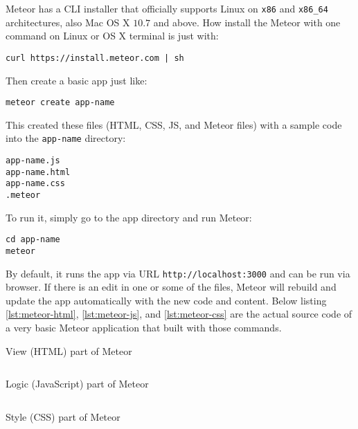 Meteor has a \ac{CLI} installer that officially supports Linux on \verb|x86| and \verb|x86_64| architectures, also Mac OS X $10.7$ and above.
How install the Meteor with one command on Linux or OS X terminal is just with:

\begin{verbatim}
curl https://install.meteor.com | sh
\end{verbatim}

\noindent Then create a basic app just like:

\begin{verbatim}
meteor create app-name
\end{verbatim}

This created these files (\ac{HTML}, \ac{CSS}, \ac{JS}, and Meteor files) with a sample code into the \verb|app-name| directory:

\begin{verbatim}
app-name.js
app-name.html
app-name.css
.meteor
\end{verbatim}

To run it, simply go to the app directory and run Meteor:

\begin{verbatim}
cd app-name
meteor
\end{verbatim}

By default, it runs the app via \ac{URL} \verb|http://localhost:3000| and can be run via browser.
If there is an edit in one or some of the files, Meteor will rebuild and update the app automatically with the new code and content.
\noindent Below listing \autoref{lst:meteor-html}, \autoref{lst:meteor-js}, and \autoref{lst:meteor-css} are the actual source code of a very basic Meteor application that built with those commands.

\begin{listing}[!hp]
\caption{View (HTML) part of Meteor}
\inputminted{html}{\dir/include/meteor/meteor.html}
\label{lst:meteor-html}
\end{listing}

\begin{listing}[!hp]
\caption{Logic (JavaScript) part of Meteor}
\inputminted{javascript}{\dir/include/meteor/meteor.js}
\label{lst:meteor-js}
\end{listing}

\begin{listing}[!hp]
\caption{Style (CSS) part of Meteor}
\inputminted{css}{\dir/include/meteor/meteor.css}
\label{lst:meteor-css}
\end{listing}
